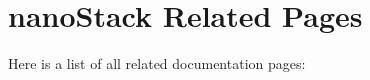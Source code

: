 \section{nano\-Stack Related Pages}
Here is a list of all related documentation pages:\begin{CompactList}
\item {}

\end{CompactList}
